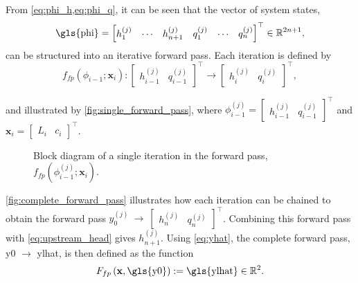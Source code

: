 From \cref{eq:phi_h,eq:phi_q}, it can be seen that the vector of system states,
\begin{equation*}
    \text{\gls{phi}}=\begin{bmatrix}
        h_1^{(j)}&\cdots&h_{n+1}^{(j)} & q_1^{(j)} & \cdots & q_{n}^{(j)}
    \end{bmatrix}^\top\in\mathbb{R}^{2n+1},
\end{equation*}
can be structured into an iterative forward pass. Each iteration is defined by 
\begin{equation*}
f_{fp}({\phi_{i-1}};\mathbf{x}_i): \begin{bmatrix}
    h_{i-1}^{(j)} &  q_{i-1}^{(j)}
\end{bmatrix}^\top \to \begin{bmatrix}
    h_{i}^{(j)} & q_{i}^{(j)}
\end{bmatrix}^\top,
\end{equation*}

and illustrated by \autoref{fig:single_forward_pass}, where 
$\phi_{i-1}^{(j)}= \begin{bmatrix}
    h_{i-1}^{(j)} &
    q_{i-1}^{(j)}
\end{bmatrix}^\top$
and
$\mathbf{x}_i=\begin{bmatrix}
    L_i &
    c_i
\end{bmatrix}^\top$.

\begin{figure}[h!]
    \centering
    
    \caption[Block diagram of a single iteration in the forward pass]{Block diagram of a single iteration in the forward pass, $f_{fp}({\phi_{i-1}^{(j)}};\mathbf{x}_i)$.}
    \label{fig:single_forward_pass}
\end{figure}

\FloatBarrier
\newpage

\autoref{fig:complete_forward_pass} illustrates how each iteration can be chained to obtain the forward pass 
$y_0^{(j)}~\to~\begin{bmatrix}
    h_{n}^{(j)} & q_n^{(j)}
\end{bmatrix}^\top$. Combining this forward pass with \cref{eq:upstream_head} gives $h_{n+1}^{(j)}$. Using \cref{eq:yhat}, the complete forward pass, \gls{y0} $\to$ \gls{ylhat}, is then defined as the function
\begin{equation*}
    F_{fp}\left(\mathbf{x}, \text{\gls{y0}}\right) := \text{\gls{ylhat}} \in \mathbb{R}^2.
\end{equation*}

